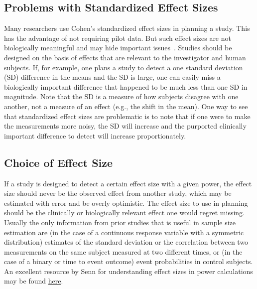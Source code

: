 \subsection{Problems with Standardized Effect Sizes}
Many researchers use Cohen's standardized effect sizes in planning a
study. This has the advantage of not requiring pilot data. But such
effect sizes are not biologically meaningful and may hide important
issues~\cite{len01som}. Studies should be designed on the basis
of effects that are relevant to the investigator and human
subjects. If, for example, one plans a study to detect a one standard
deviation (SD) difference in the means and the SD is large, one can
easily miss a biologically important difference that happened to be
much less than one SD in magnitude. Note that the SD is a measure of
how subjects disagree with one another, not a measure of an effect
(e.g., the shift in the mean).  One way to see that standardized
effect sizes are problematic is to note that if one were to make the
measurements more noisy, the SD will increase and the purported
clinically important difference to detect will increase proportionately.

\subsection{Choice of Effect Size}
If a study is designed to detect a certain effect size with a given
power, the effect size should never be the observed effect from
another study, which may be estimated with error and be overly
optimistic. The effect size to use in planning should be the
clinically or biologically relevant effect one would regret
missing.  Usually the only information from prior studies that is
useful in sample size estimation are (in the case of a continuous
response variable with a symmetric distribution) estimates of the
standard deviation or the correlation between two measurements on the
same subject measured at two different times, or (in the case of a
binary or time to event outcome) event probabilities in control
subjects.  An excellent resource by Senn for understanding effect
sizes in power calculations may be found \href{https://errorstatistics.com/2014/03/17/stephen-senn-on-how-to-interpret-discrepancies-against-which-a-test-has-high-power-guest-post/amp}{here}.

